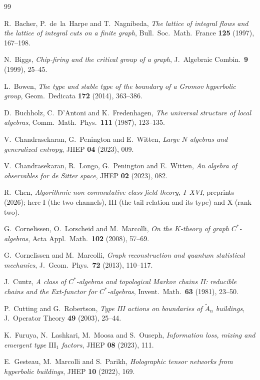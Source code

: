 \documentclass[11pt]{article}
\theoremstyle{plain}
\theoremstyle{remark}
\begin{document}
\begin{thebibliography}{99}

 R.~Bacher, P.~de~la~Harpe and T.~Nagnibeda,
\emph{The lattice of integral flows and the lattice of integral cuts on a finite graph},
Bull.\ Soc.\ Math.\ France \textbf{125} (1997), 167--198.

 N.~Biggs,
\emph{Chip-firing and the critical group of a graph},
J.\ Algebraic Combin.\ \textbf{9} (1999), 25--45.

 L.~Bowen,
\emph{The type and stable type of the boundary of a Gromov hyperbolic group},
Geom.\ Dedicata \textbf{172} (2014), 363--386.

 D.~Buchholz, C.~D'Antoni and K.~Fredenhagen,
\emph{The universal structure of local algebras},
Comm.\ Math.\ Phys.\ \textbf{111} (1987), 123--135.

 V.~Chandrasekaran, G.~Penington and E.~Witten,
\emph{Large $N$ algebras and generalized entropy},
JHEP \textbf{04} (2023), 009.

 V.~Chandrasekaran, R.~Longo, G.~Penington and E.~Witten,
\emph{An algebra of observables for de Sitter space},
JHEP \textbf{02} (2023), 082.

 R.~Chen,
\emph{Algorithmic non-commutative class field theory, I--XVI}, preprints (2026);
here I (the two channels), III (the tail relation and its type) and X (rank two).

 G.~Cornelissen, O.~Lorscheid and M.~Marcolli,
\emph{On the $K$-theory of graph $C^*$-algebras},
Acta Appl.\ Math.\ \textbf{102} (2008), 57--69.

 G.~Cornelissen and M.~Marcolli,
\emph{Graph reconstruction and quantum statistical mechanics},
J.\ Geom.\ Phys.\ \textbf{72} (2013), 110--117.

 J.~Cuntz,
\emph{A class of $C^*$-algebras and topological Markov chains II: reducible chains and the
Ext-functor for $C^*$-algebras}, Invent.\ Math.\ \textbf{63} (1981), 23--50.

 P.~Cutting and G.~Robertson,
\emph{Type III actions on boundaries of $\widetilde A_n$ buildings},
J.\ Operator Theory \textbf{49} (2003), 25--44.

 K.~Furuya, N.~Lashkari, M.~Moosa and S.~Ouseph,
\emph{Information loss, mixing and emergent type $\mathrm{III}_1$ factors},
JHEP \textbf{08} (2023), 111.

 E.~Gesteau, M.~Marcolli and S.~Parikh,
\emph{Holographic tensor networks from hyperbolic buildings},
JHEP \textbf{10} (2022), 169.


\end{thebibliography}
\end{document}
